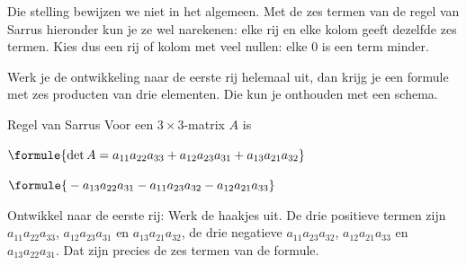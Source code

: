Die stelling bewijzen we niet in het algemeen. Met de zes termen van de regel van Sarrus hieronder kun je ze wel narekenen: elke rij en elke kolom geeft dezelfde zes termen. Kies dus een rij of kolom met veel nullen: elke 0 is een term minder.


Werk je de ontwikkeling naar de eerste rij helemaal uit, dan krijg je een formule met zes producten van drie elementen. Die kun je onthouden met een schema.

\begin{theorie}
\begin{stelling}{Regel van Sarrus}
Voor een $3 \times 3$-matrix $A$ is

\vspace{1mm}
\qquad $\formule{\det A = a_{11}a_{22}a_{33} + a_{12}a_{23}a_{31} + a_{13}a_{21}a_{32}}$

\qquad\qquad\quad $\formule{{} - a_{13}a_{22}a_{31} - a_{11}a_{23}a_{32} - a_{12}a_{21}a_{33}}$
\end{stelling}

\begin{bewijs}
Ontwikkel naar de eerste rij:
Werk de haakjes uit. De drie positieve termen zijn $a_{11}a_{22}a_{33}$, $a_{12}a_{23}a_{31}$ en $a_{13}a_{21}a_{32}$, de drie negatieve $a_{11}a_{23}a_{32}$, $a_{12}a_{21}a_{33}$ en $a_{13}a_{22}a_{31}$. Dat zijn precies de zes termen van de formule.
\end{bewijs}
\end{theorie}

